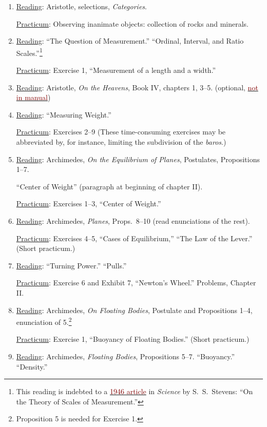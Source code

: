 \documentclass{article}
\newcommand{\rd}{\uline{Reading}}
\newcommand{\pc}{\uline{Practicum}}
\begin{document}
\begin{enumerate}
\item \rd:  Aristotle, selections, \emph{Categories}.\label{cat}

\pc: Observing inanimate objects: collection of rocks and minerals.

\item \rd:  ``The Question of Measurement.'' ``Ordinal, Interval, and Ratio Scales.''\footnote{This reading is indebted to a \hyperlink{Stevens.1}{\textcolor{Maroon}{1946 article}} in \emph{Science} by S.\ S.\ Stevens: ``On the Theory of Scales of Measurement.''}  

	\pc: Exercise 1, ``Measurement of a length and a width.''
	
	\item \rd: Aristotle, \emph{On the Heavens}, Book IV, chapters 1, 3--5. (optional, \hyperlink{heavens.1}{\textcolor{Maroon}{not in manual}})

\item \rd:  ``Measuring Weight.''

	\pc: Exercises 2--9 (These time-consuming exercises may be abbreviated by, for instance, limiting the subdivision of the \emph{baros}.)

	\item \rd: Archimedes, \emph{On the Equilibrium of Planes}, Postulates, Propositions 1--7.
	 
	``Center of Weight'' (paragraph at beginning of chapter II). 

	\pc: Exercises 1--3, ``Center of Weight.''

\item \rd:  Archimedes, \emph{Planes}, Props.\ 8--10 (read enunciations of the rest). 

\pc: Exercises 4--5, ``Cases of Equilibrium,'' ``The Law of the Lever.'' (Short practicum.) 

\item \rd:  ``Turning Power.'' ``Pulls.'' 

	\pc: Exercise 6 and Exhibit 7, ``Newton’s Wheel.'' Problems, Chapter II.

\item \rd:   Archimedes, \emph{On Floating Bodies}, Postulate and
	Propositions 1--4, enunciation of 5.\footnote{Proposition 5 is needed for Exercise 1.} 

	\pc: Exercise 1, ``Buoyancy of Floating Bodies.'' (Short practicum.)

\item \rd:  Archimedes, \emph{Floating Bodies}, Propositions 5--7. ``Buoyancy.'' ``Density.'' 


\end{enumerate}
\end{document}
